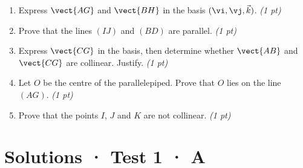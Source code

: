 \begin{enumerate}

\item Express $\vect{AG}$ and $\vect{BH}$ in the basis $(\vi,\vj,\vec k)$. \hfill\textit{(1 pt)}

\item Prove that the lines $(IJ)$ and $(BD)$ are parallel. \hfill\textit{(1 pt)}

\item Express $\vect{CG}$ in the basis, then determine whether $\vect{AB}$ and $\vect{CG}$ are collinear. Justify. \hfill\textit{(1 pt)}

\item Let $O$ be the centre of the parallelepiped. Prove that $O$ lies on the line $(AG)$. \hfill\textit{(1 pt)}

\item Prove that the points $I$, $J$ and $K$ are not collinear. \hfill\textit{(1 pt)}

\end{enumerate}

\ifmxteacher\mxnewpage

\section*{Solutions · Test 1 · A}\label{cor:1-3}

